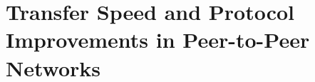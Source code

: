 
\chapter{Transfer Speed and Protocol Improvements in Peer-to-Peer Networks}
\label{chapter:proto-improve}
